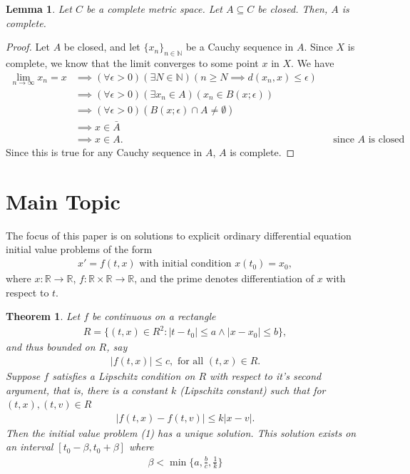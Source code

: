 \documentclass[10pt,a4paper]{article}
\theoremstyle{theorem}
\newtheorem{theorem}{Theorem}
\newtheorem{lemma}{Lemma}
\theoremstyle{definition}
\begin{document}
\begin{lemma}
Let $C$ be a complete metric space. Let $A \subseteq C$ be closed. Then, $A$ is complete.
\end{lemma}

\begin{proof}
Let $A$ be closed, and let $\{x_n\}_{n \in \mathbb{N}}$ be a Cauchy sequence in $A$.  Since $X$ is complete, we know that the limit converges to some point $x$ in $X$.  We have
\begin{align*}
\lim_{n \to \infty} x_n = x &\implies (\forall \epsilon > 0)(\exists N \in \mathbb{N})(n \geq N \implies d(x_n, x) \leq \epsilon)\\
&\implies (\forall \epsilon > 0)(\exists x_n \in A)(x_n \in B(x; \epsilon))\\
&\implies (\forall \epsilon > 0)(B(x; \epsilon) \cap A \not = \emptyset)\\
&\implies x \in \bar{A}\\
&\implies x \in A. && \text{since } A \text{ is closed}
\end{align*}
Since this is true for any Cauchy sequence in $A$, $A$ is complete.
\end{proof}

\section{Main Topic}
The focus of this paper is on solutions to explicit ordinary differential equation initial value problems of the form
\begin{align}
x' = f(t, x) \text{ with initial condition } x(t_0) = x_0,
\end{align}
where $x: \mathbb{R} \to \mathbb{R}$, $f: \mathbb{R} \times \mathbb{R} \to \mathbb{R}$, and the prime denotes differentiation of $x$ with respect to $t$.

\begin{theorem}
Let $f$ be continuous on a rectangle 
\begin{align*}
R = \{(t, x) \mathbb \in {R}^2 : |t - t_0| \leq a \land |x - x_0| \leq b \},
\end{align*}
and thus bounded on $R$, say
\begin{align}
|f(t, x)| \leq c, \text{ for all } (t, x) \in R.
\end{align}
Suppose $f$ satisfies a Lipschitz condition on $R$ with respect to it's second argument, that is, there is a constant $k$ (Lipschitz constant) such that for $(t, x), (t, v) \in R$
\begin{align}
|f(t, x) - f(t, v)| \leq k |x - v|.
\end{align}
Then the initial value problem (1) has a unique solution. This solution exists on an interval $[t_0 - \beta, t_0 + \beta]$ where 
\begin{align}
\beta < \min \Bigg \{a, \frac{b}{c}, \frac{1}{k} \Bigg \}
\end{align}
\end{theorem}
\end{document}
